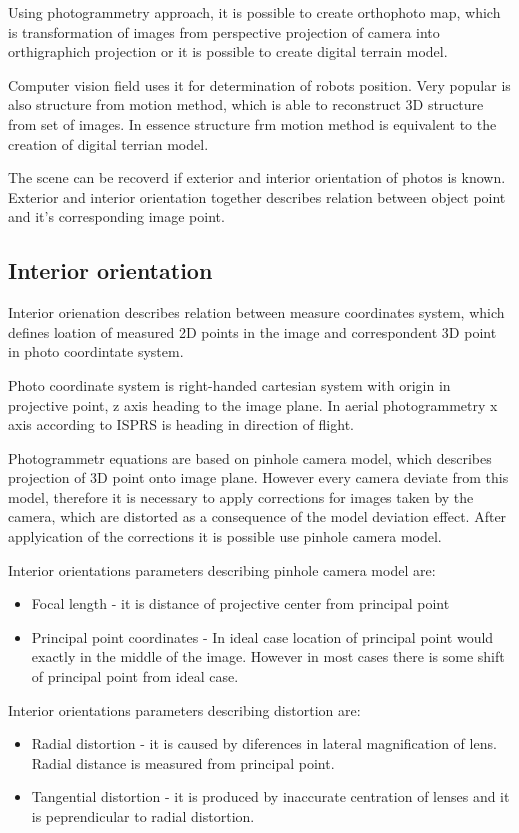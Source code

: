\documentclass[a4paper,12pt]{report}
\begin{document}
Using photogrammetry approach, it is possible to create orthophoto map, which is transformation of images from 
perspective projection of camera  into orthigraphich projection or it is possible to create digital terrain model.

Computer vision field uses it for determination of robots position. Very popular is also structure from motion method,
which is able to reconstruct 3D structure from set of images. In essence structure frm motion method is equivalent to the creation 
of digital terrian model.

The scene can be recoverd if exterior and interior orientation of photos is known.
Exterior and interior orientation together describes relation between object point and
it's corresponding image point.

\subsection{Interior orientation}

Interior orienation describes relation between measure coordinates system, which defines loation of measured 2D points in the image 
and correspondent 3D point in photo coordintate system.

Photo coordinate system is right-handed cartesian system with origin in projective point, z axis heading to the image plane. In aerial photogrammetry
x axis according to ISPRS is heading in direction of flight. 

Photogrammetr equations are based on pinhole camera model, which describes projection of 3D point onto image plane. 
However every camera deviate from this model, therefore it is necessary to apply corrections for images taken by the camera,
which are distorted  as a consequence of the model deviation effect.
After applyication of the corrections it is possible use pinhole camera model.

Interior orientations parameters describing pinhole camera model are:
\begin{itemize}
  \item Focal length - it is distance of projective center from principal point
  \item Principal point coordinates - In ideal case location of principal point would exactly in the middle 
	of the image.  
	However in most cases there is some shift of principal point from ideal case.
\end{itemize}


Interior orientations parameters describing distortion are:
\begin{itemize}
  \item Radial distortion - it is caused by diferences in lateral magnification of lens. Radial distance is measured from principal point.
  \item Tangential distortion - it is produced by inaccurate centration of lenses and it is peprendicular to radial distortion.
\end{itemize}
\end{document}

